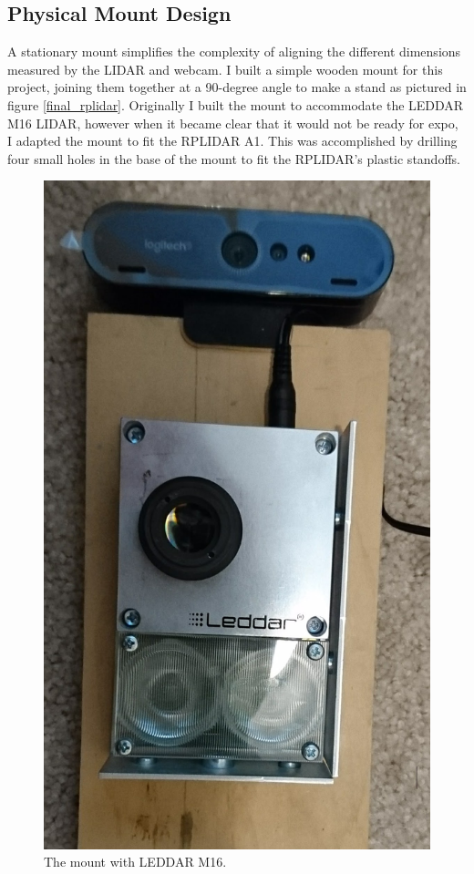 \documentclass[onecolumn, draftclsnofoot,10pt, compsoc]{IEEEtran}
\makeatletter
\newcommand\captionof[1]{\def\@captype{#1}\caption}
\makeatother
\begin{document}
\begin{singlespace}
		\subsection{Physical Mount Design}

		A stationary mount simplifies the complexity of aligning the different dimensions measured by the LIDAR and webcam. 
		I built a simple wooden mount for this project, joining them together at a 90-degree angle to make a stand as pictured in figure \ref{final_rplidar}.
		Originally I built the mount to accommodate the LEDDAR M16 LIDAR, however when it became clear that it would not be ready for expo, I adapted the mount to fit the RPLIDAR A1. 
		This was accomplished by drilling four small holes in the base of the mount to fit the RPLIDAR's plastic standoffs.

		\begin{figure}[H]
			\includegraphics[scale=0.15]{mount_m16.JPG}
			\captionof{figure}{The mount with LEDDAR M16.}
			\label{mount_m16}
		\end{figure}


\end{singlespace}
\end{document}
